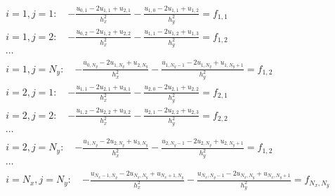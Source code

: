 \documentclass{beamer}
\begin{document}
\begin{frame} 


\[\begin{array}{l}
i=1, j=1:\quad {\displaystyle -\frac{u_{0,1}-2u_{1,1}+u_{2,1}}{h_x^2}-\frac{u_{1,0}-2u_{1,1}+u_{1,2}}{h_y^2} }=f_{1,1} \\
i=1, j=2:\quad {\displaystyle -\frac{u_{0,2}-2u_{1,2}+u_{2,2}}{h_x^2}-\frac{u_{1,1}-2u_{1,2}+u_{1,3}}{h_y^2} }=f_{1,2} \\
\cdots\\
i=1, j=N_y:\quad {\displaystyle -\frac{u_{0,N_y}-2u_{1,N_y}+u_{2,N_y}}{h_x^2}-\frac{u_{1,N_y-1}-2u_{1,N_y}+u_{1,N_y+1}}{h_y^2} }=f_{1,2} \\
i=2, j=1:\quad {\displaystyle -\frac{u_{1,1}-2u_{2,1}+u_{3,1}}{h_x^2}-\frac{u_{2,0}-2u_{2,1}+u_{2,2}}{h_y^2} }=f_{2,1} \\
i=2, j=2:\quad {\displaystyle -\frac{u_{1,2}-2u_{2,2}+u_{3,2}}{h_x^2}-\frac{u_{2,1}-2u_{2,2}+u_{2,3}}{h_y^2} }=f_{2,2} \\
\cdots\\
i=2, j=N_y:\quad {\displaystyle -\frac{u_{1,N_y}-2u_{2,N_y}+u_{3,N_y}}{h_x^2}-\frac{u_{2,N_y-1}-2u_{2,N_y}+u_{2,N_y+1}}{h_y^2} }=f_{1,2} \\
\cdots\\
i=N_x, j=N_y:\quad {\displaystyle -\frac{u_{N_x-1,N_y}-2u_{N_x,N_y}+u_{N_x+1,N_y}}{h_x^2}-\frac{u_{N_x,N_y-1}-2u_{N_x,N_y}+u_{N_x,N_y+1}}{h_y^2} }=f_{N_x,N_y} 
\end{array}
\]

 \end{frame}
 
\end{document}
